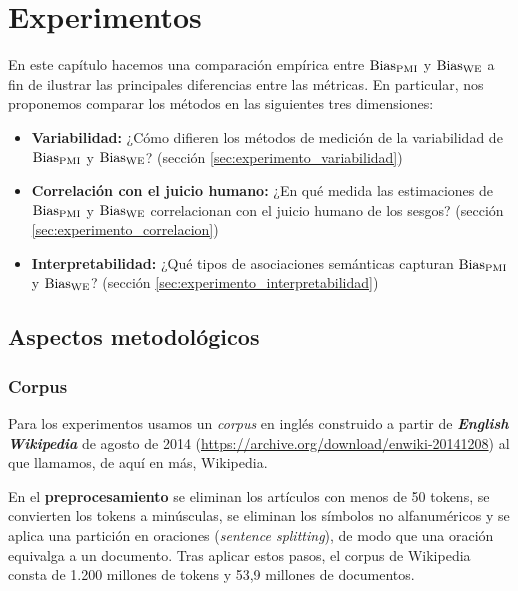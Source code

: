 
\chapter{Experimentos} \label{cap:experimentos}



En este capítulo hacemos una comparación empírica entre $\operatorname{Bias_{PMI}}$ y $\operatorname{Bias_{WE}}$ a fin de ilustrar las principales diferencias entre las métricas. En particular, nos proponemos comparar los métodos en las siguientes tres dimensiones:

\begin{itemize}
    
    \item \textbf{Variabilidad:} ¿Cómo difieren los métodos de medición de la variabilidad de $\operatorname{Bias_{PMI}}$ y $\operatorname{Bias_{WE}}$? (sección \ref{sec:experimento_variabilidad})
    
    \item \textbf{Correlación con el juicio humano:} ¿En qué medida las estimaciones de $\operatorname{Bias_{PMI}}$ y $\operatorname{Bias_{WE}}$ correlacionan con el juicio humano de los sesgos? (sección \ref{sec:experimento_correlacion})

    \item \textbf{Interpretabilidad:} ¿Qué tipos de asociaciones semánticas capturan $\operatorname{Bias_{PMI}}$ y $\operatorname{Bias_{WE}}$? (sección \ref{sec:experimento_interpretabilidad})

\end{itemize}


\section{Aspectos metodológicos} \label{sec:metodologia}

\subsection{Corpus} \label{sec:corpus}

Para los experimentos usamos un \emph{corpus} en inglés construido a partir de \textbf{\emph{English Wikipedia}} de agosto de 2014 (\url{https://archive.org/download/enwiki-20141208}) al que llamamos, de aquí en más, Wikipedia. 


En el \textbf{preprocesamiento} se eliminan los artículos con menos de 50 tokens, se convierten los tokens a minúsculas, se eliminan los símbolos no alfanuméricos y se aplica una partición en oraciones (\emph{sentence splitting}), de modo que una oración equivalga a un documento. Tras aplicar estos pasos, el corpus de Wikipedia consta de 1.200 millones de tokens y 53,9 millones de documentos. 


